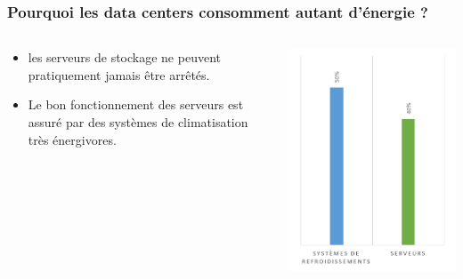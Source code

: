 \documentclass[xcolor=dvipsnames]{beamer}
\begin{document}
\begin{frame}
\frametitle{Pourquoi les data centers consomment autant d'énergie ?}
\begin{columns}
\begin{column}{0.55\textwidth}
\begin{block}{}
\begin{itemize}
\item les serveurs de stockage ne peuvent pratiquement jamais être arrêtés.
\end{itemize}
\end{block}
\begin{block}{}
\begin{itemize}
\item Le bon fonctionnement des serveurs est assuré par des systèmes de climatisation très énergivores.
\end{itemize}
\end{block}
\end{column}
\begin{column}{0.40\textwidth}
\includegraphics[scale=0.5]{conso.png}
\end{column}
\end{columns}
\end{frame}
\end{document}
